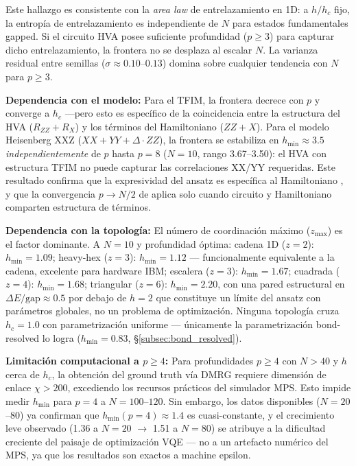 \documentclass[11pt,a4paper,spanish]{book}
\begin{document}
Este hallazgo es consistente con la \emph{area law} de entrelazamiento en 1D: a $h/h_c$ fijo, la entropía de entrelazamiento es independiente de $N$ para estados fundamentales gapped. Si el circuito HVA posee suficiente profundidad ($p \geq 3$) para capturar dicho entrelazamiento, la frontera no se desplaza al escalar $N$. La varianza residual entre semillas ($\sigma \approx 0.10$--$0.13$) domina sobre cualquier tendencia con $N$ para $p \geq 3$.

\textbf{Dependencia con el modelo:} Para el TFIM, la frontera decrece con $p$ y converge a $h_c$ ---pero esto es específico de la coincidencia entre la estructura del HVA ($R_{ZZ} + R_X$) y los términos del Hamiltoniano ($ZZ + X$). Para el modelo Heisenberg XXZ ($XX + YY + \Delta \cdot ZZ$), la frontera se estabiliza en $h_{\min} \approx 3.5$ \emph{independientemente} de $p$ hasta $p = 8$ ($N = 10$, rango 3.67--3.50): el HVA con estructura TFIM no puede capturar las correlaciones XX/YY requeridas. Este resultado confirma que la expresividad del ansatz es específica al Hamiltoniano \citep{wiersema2020}, y que la convergencia $p \to N/2$ de \citet{sumeet2025} aplica solo cuando circuito y Hamiltoniano comparten estructura de términos.

\textbf{Dependencia con la topología:} El número de coordinación máximo ($z_{\max}$) es el factor dominante. A $N = 10$ y profundidad óptima: cadena 1D ($z = 2$): $h_{\min} = 1.09$; heavy-hex ($z = 3$): $h_{\min} = 1.12$ --- funcionalmente equivalente a la cadena, excelente para hardware IBM; escalera ($z = 3$): $h_{\min} = 1.67$; cuadrada ($z = 4$): $h_{\min} = 1.68$; triangular ($z = 6$): $h_{\min} = 2.20$, con una pared estructural en $\Delta E/\text{gap} \approx 0.5$ por debajo de $h = 2$ que constituye un límite del ansatz con parámetros globales, no un problema de optimización. Ninguna topología cruza $h_c = 1.0$ con parametrización uniforme --- únicamente la parametrización bond-resolved lo logra ($h_{\min} = 0.83$, §\ref{subsec:bond_resolved}).

\textbf{Limitación computacional a $p \geq 4$:} Para profundidades $p \geq 4$ con $N > 40$ y $h$ cerca de $h_c$, la obtención del ground truth vía DMRG requiere dimensión de enlace $\chi > 200$, excediendo los recursos prácticos del simulador MPS. Esto impide medir $h_{\min}$ para $p = 4$ a $N = 100$--$120$. Sin embargo, los datos disponibles ($N = 20$--$80$) ya confirman que $h_{\min}(p{=}4) \approx 1.4$ es cuasi-constante, y el crecimiento leve observado (1.36 a $N = 20$ $\to$ 1.51 a $N = 80$) se atribuye a la dificultad creciente del paisaje de optimización VQE --- no a un artefacto numérico del MPS, ya que los resultados son exactos a machine epsilon.
\end{document}
